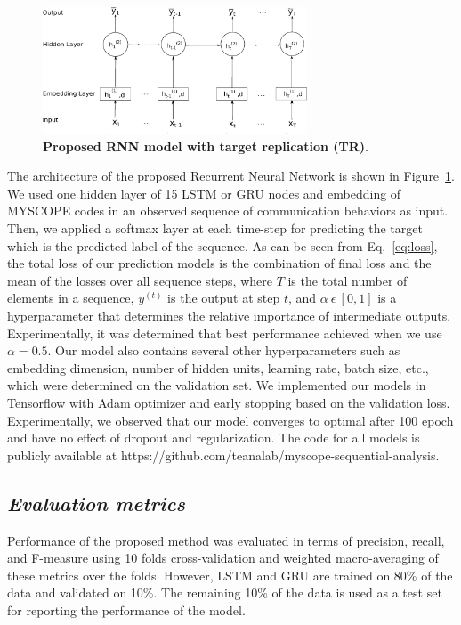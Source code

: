 \documentclass{amia_summit_2018}
\begin{document}
\begin{figure}[!htb]
    \centering
    \includegraphics[width=0.70\textwidth]{figures/rnn_small.eps}
    \caption{\textbf{Proposed RNN model with target replication (TR)}.}
    \label{fig:rnn-model}
\end{figure}
The architecture of the proposed Recurrent Neural Network is shown in Figure~\ref{fig:rnn-model}. We used one hidden layer of 15 LSTM or GRU nodes and embedding of MYSCOPE codes in an observed
sequence of communication behaviors as input. Then, we applied a softmax layer at each time-step for predicting the target which is the predicted label of the sequence. As can be seen from
Eq.~\ref{eq:loss}, the total loss of our prediction models is the combination of final loss and the mean of the losses over all sequence steps, where $T$ is the total number of elements in a sequence,
$\bar y^{(t)}$ is the output at step $t$, and $\alpha\ \epsilon\ [0, 1]$ is a hyperparameter that determines the relative importance of intermediate outputs. Experimentally, it was determined that
best performance achieved when we use $\alpha=0.5$. Our model also contains several other hyperparameters such as embedding dimension, number of hidden units, learning rate, batch size, etc., which
were determined on the validation set. We implemented our models in Tensorflow with Adam optimizer and early stopping based on the validation loss. Experimentally, we observed that our model converges
to optimal after 100 epoch and have no effect of dropout and regularization. The code for all models is publicly available at https://github.com/teanalab/myscope-sequential-analysis.   
  
\subsection*{\textit{Evaluation metrics}}
Performance of the proposed method was evaluated in terms of precision, recall, and F-measure using 10 folds cross-validation and weighted macro-averaging of these metrics over the folds. However, LSTM and GRU are trained on 80\% of the data and validated on 10\%. The remaining 10\% of the data is used as a test set for reporting the performance of the model. 
\end{document}
